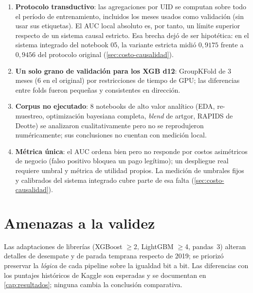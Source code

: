 \begin{enumerate}
  \item \textbf{Protocolo transductivo}: las agregaciones por UID se computan sobre todo el
        período de entrenamiento, incluidos los meses usados como validación (sin usar sus
        etiquetas). El AUC local absoluto es, por tanto, un límite superior respecto de un
        sistema causal estricto. Esa brecha dejó de ser hipotética: en el sistema integrado del
        notebook 05, la variante estricta midió $0{,}9175$ frente a $0{,}9456$ del protocolo
        original (\cref{sec:costo-causalidad}).
  \item \textbf{Un solo grano de validación para los XGB d12}: GroupKFold de 3 meses (6 en el
        original) por restricciones de tiempo de GPU; las diferencias entre folds fueron
        pequeñas y consistentes en dirección.
  \item \textbf{Corpus no ejecutado}: 8 notebooks de alto valor analítico (EDA, re-muestreo,
        optimización bayesiana completa, \emph{blend} de artgor, RAPIDS de Deotte) se analizaron
        cualitativamente pero no se reprodujeron numéricamente; sus conclusiones no cuentan con
        medición local.
  \item \textbf{Métrica única}: el AUC ordena bien pero no responde por costos asimétricos de
        negocio (falso positivo bloquea un pago legítimo); un despliegue real requiere umbral y
        métrica de utilidad propios. La medición de umbrales fijos y calibrados del sistema
        integrado cubre parte de esa falta (\cref{sec:costo-causalidad}).
\end{enumerate}

\section{Amenazas a la validez}

Las adaptaciones de librerías (XGBoost $\ge$2, LightGBM $\ge$4, pandas~3) alteran detalles de
desempate y de parada temprana respecto de 2019; se priorizó preservar la \emph{lógica} de cada
pipeline sobre la igualdad bit a bit. Las diferencias con los puntajes históricos de Kaggle son
esperadas y se documentan en \cref{cap:resultados}; ninguna cambia la conclusión comparativa.
